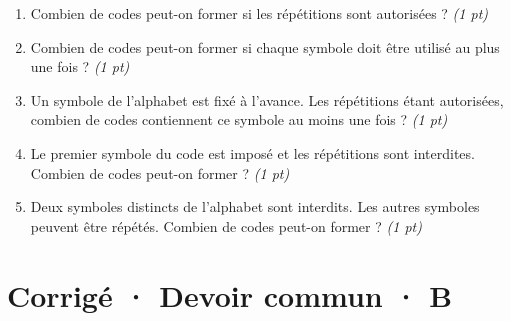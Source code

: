 \begin{enumerate}

\item Combien de codes peut-on former si les répétitions sont autorisées ? \hfill\textit{(1 pt)}

\item Combien de codes peut-on former si chaque symbole doit être utilisé au plus une fois ? \hfill\textit{(1 pt)}

\item Un symbole de l'alphabet est fixé à l'avance. Les répétitions étant autorisées, combien de codes contiennent ce symbole au moins une fois ? \hfill\textit{(1 pt)}

\item Le premier symbole du code est imposé et les répétitions sont interdites. Combien de codes peut-on former ? \hfill\textit{(1 pt)}

\item Deux symboles distincts de l'alphabet sont interdits. Les autres symboles peuvent être répétés. Combien de codes peut-on former ? \hfill\textit{(1 pt)}

\end{enumerate}

\ifmxteacher\mxnewpage

\section*{Corrigé · Devoir commun · B}\label{cor:3-4}

